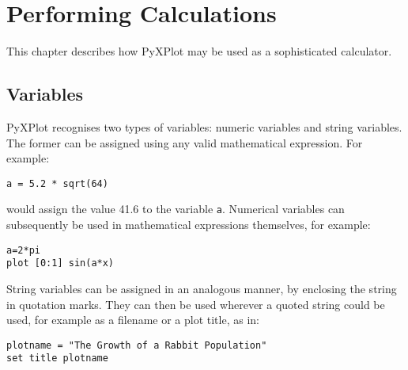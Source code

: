 %
%
%
%
%



\chapter{Performing Calculations}

This chapter describes how PyXPlot may be used as a sophisticated calculator.

\section{Variables}

PyXPlot recognises two types of variables: numeric variables and string
variables.  The former can be assigned using any valid mathematical expression.
For example:

\begin{verbatim}
a = 5.2 * sqrt(64)
\end{verbatim}

\noindent would assign the value 41.6 to the variable {\tt a}.  Numerical variables can
subsequently be used in mathematical expressions themselves, for example:

\begin{verbatim}
a=2*pi
plot [0:1] sin(a*x)
\end{verbatim}

\noindent String variables can be assigned in an analogous manner, by enclosing
the string in quotation marks. They can then be used wherever a quoted string
could be used, for example as a filename or a plot title, as
in:

\begin{verbatim}
plotname = "The Growth of a Rabbit Population"
set title plotname
\end{verbatim}

